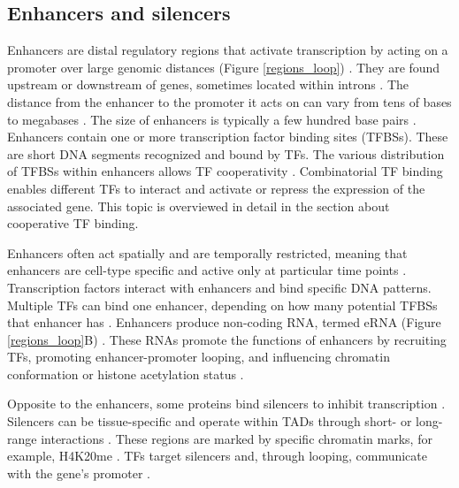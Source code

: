     \subsection{Enhancers and silencers}

    Enhancers are distal regulatory regions that activate transcription by acting on a promoter over large genomic distances ({Figure \ref{regions_loop}}) \cite{smith2014enhancer,pennacchio2013enhancers}. They are found upstream or downstream of genes, sometimes located within introns \cite{pennacchio2013enhancers}. The distance from the enhancer to the promoter it acts on can vary from tens of bases to megabases \cite{serfling1985enhancers,field2020evaluating,karpinska2023role}. The size of enhancers is typically a few hundred base pairs \cite{spitz2012transcription}. Enhancers contain one or more transcription factor binding sites (TFBSs). These are short DNA segments recognized and bound by TFs. The various distribution of TFBSs within enhancers allows TF cooperativity \cite{spitz2012transcription}. Combinatorial TF binding enables different TFs to interact and activate or repress the expression of the associated gene. This topic is overviewed in detail in the section about cooperative TF binding.

    Enhancers often act spatially and are temporally restricted, meaning that enhancers are cell-type specific and active only at particular time points \cite{field2020evaluating}. Transcription factors interact with enhancers and bind specific DNA patterns. Multiple TFs can bind one enhancer, depending on how many potential TFBSs that enhancer has \cite{wu2019super,field2020evaluating}. Enhancers produce non-coding RNA, termed \ac{eRNA} ({Figure \ref{regions_loop}}B) \cite{tippens2018enhancer,smith2014enhancer}. These RNAs promote the functions of enhancers by recruiting TFs, promoting enhancer-promoter looping, and influencing chromatin conformation or histone acetylation status \cite{wu2019super,field2020evaluating}.

    Opposite to the enhancers, some proteins bind silencers to inhibit transcription \cite{spitz2012transcription}. Silencers can be tissue-specific and operate within TADs through short- or long-range interactions \cite{pang2020systematic,pang2023identification}. These regions are marked by specific chromatin marks, for example, \ac{H4K20me} \cite{pang2020systematic,beck2012pr}. TFs target silencers and, through looping, communicate with the gene's promoter \cite{pang2023identification}.

